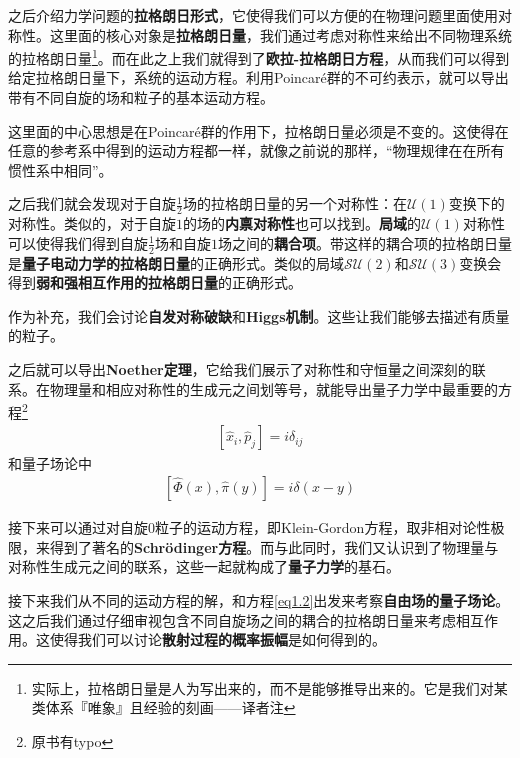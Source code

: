 之后介绍力学问题的{\bfseries 拉格朗日形式}，它使得我们可以方便的在物理问题里面使用对称性。这里面的核心对象是{\bfseries 拉格朗日量}，我们通过考虑对称性来给出不同物理系统的拉格朗日量\footnote{实际上，拉格朗日量是人为写出来的，而不是能够推导出来的。它是我们对某类体系『唯象』且经验的刻画——译者注}。而在此之上我们就得到了{\bfseries 欧拉-拉格朗日方程}，从而我们可以得到给定拉格朗日量下，系统的运动方程。利用Poincaré群的不可约表示，就可以导出带有不同自旋的场和粒子的基本运动方程。

这里面的中心思想是在Poincaré群的作用下，拉格朗日量必须是不变的。这使得在任意的参考系中得到的运动方程都一样，就像之前说的那样，“物理规律在在所有惯性系中相同”。

之后我们就会发现对于自旋$\tfrac{1}{2}$场的拉格朗日量的另一个对称性：在$\mathcal{U}(1)$变换下的对称性。类似的，对于自旋$1$的场的{\bfseries 内禀对称性}也可以找到。{\bfseries 局域}的$\mathcal{U}(1)$对称性可以使得我们得到自旋$\tfrac{1}{2}$场和自旋$1$场之间的{\bfseries 耦合项}。带这样的耦合项的拉格朗日量是{\bfseries 量子电动力学的拉格朗日量}的正确形式。类似的局域$\mathcal{SU}(2)$和$\mathcal{SU}(3)$变换会得到{\bfseries 弱和强相互作用的拉格朗日量}的正确形式。

作为补充，我们会讨论{\bfseries 自发对称破缺}和{\bfseries Higgs机制}。这些让我们能够去描述有质量的粒子。

之后就可以导出{\bfseries Noether定理}，它给我们展示了对称性和守恒量之间深刻的联系。在物理量和相应对称性的生成元之间划等号，就能导出量子力学中最重要的方程\footnote{原书有typo}
\begin{align}\label{eq1.1}
[\hat{x}_i,\hat{p}_j]=i\delta_{ij}
\end{align}
和量子场论中
\begin{align}\label{eq1.2}
[\hat{\Phi}(x),\hat{\pi}(y)]=i\delta(x-y)
\end{align}

接下来可以通过对自旋$0$粒子的运动方程，即Klein-Gordon方程，取非相对论性极限，来得到了著名的{\bfseries Schrödinger方程}。而与此同时，我们又认识到了物理量与对称性生成元之间的联系，这些一起就构成了{\bfseries 量子力学}的基石。

接下来我们从不同的运动方程的解，和方程\eqref{eq1.2}出发来考察{\bfseries 自由场的量子场论}。这之后我们通过仔细审视包含不同自旋场之间的耦合的拉格朗日量来考虑相互作用。这使得我们可以讨论{\bfseries 散射过程的概率振幅}是如何得到的。

